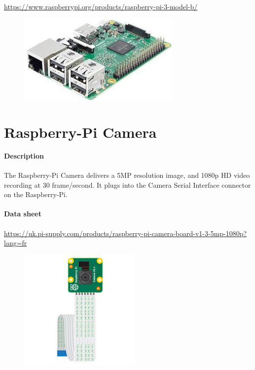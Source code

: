 \documentclass[12pt]{report}
\begin{document}
\paragraph{}
\url{https://www.raspberrypi.org/products/raspberry-pi-3-model-b/}
\begin{figure}[H]
	\begin{center}
		\includegraphics[scale=0.6]{res/raspberry.jpg}
	\end{center}
\end{figure}
\section{Raspberry-Pi Camera}
\textbf{Description}
\paragraph{}
The Raspberry-Pi Camera delivers a 5MP resolution image, and 1080p HD video recording at 30 frame/second. It plugs into the Camera Serial Interface connector on the Raspberry-Pi. \\ \\
\textbf{Data sheet} 
\paragraph{}
\url{https://uk.pi-supply.com/products/raspberry-pi-camera-board-v1-3-5mp-1080p?lang=fr}
\begin{figure}[H]
	\begin{center}
		\includegraphics[scale=0.6]{res/camera.jpg}
	\end{center}
\end{figure}
\end{document}

